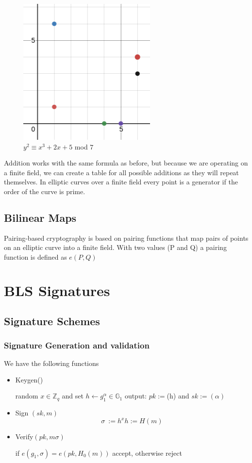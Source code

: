 \documentclass[a4paper,12pt]{scrartcl}
\begin{document}
\begin{figure}[hbt!]
	\centering
	\includegraphics[width=0.5\linewidth]{ec3}
	\caption{$y^2 \equiv x^3 + 2x + 5$ mod $7$}
\end{figure}

Addition works with the same formula as before, but because we are operating on a finite field, we can create a table for all possible additions as they will repeat themselves. In elliptic curves over a finite field every point is a generator if the order of the curve is prime.

\subsection{Bilinear Maps}
Pairing-based cryptography is based on pairing functions that map pairs of points on an elliptic curve into a finite field.\cite{security-wiki-pbc}
\newline
With two values (P and Q) a pairing function is defined as \( e(P,Q) \)

\pagebreak

\section{BLS Signatures}
\subsection{Signature Schemes}
\subsubsection{Signature Generation and validation}
We have the following functions
\begin{itemize}
	\item Keygen()
	\begin{center}
		random \( x\in \mathbb{Z}_{q} \) and set \( h \leftarrow g_{1}^\alpha\in \mathbb{G}_{1} \) output: \( pk := \)(h) and \( sk := (\alpha) \)
	\end{center}
	\item Sign \( (sk, m) \)
	\[ \sigma\ := h^x  h := H(m) \]
	\item Verify\( (pk, m \sigma) \)
	\begin{center}
		if \( e(g_{1},\sigma) = e(pk, H_{0}(m)) \) accept, otherwise reject
	\end{center}
\end{itemize}
\end{document}
